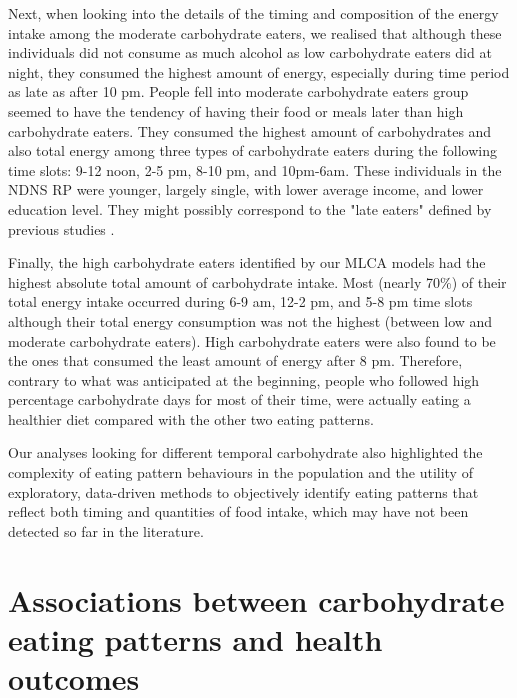 Next, when looking into the details of the timing and composition of the energy intake among the moderate carbohydrate eaters, we realised that although these individuals did not consume as much alcohol as low carbohydrate eaters did at night, they consumed the highest amount of energy, especially during time period as late as after 10 pm. People fell into moderate carbohydrate eaters group seemed to have the tendency of having their food or meals later than high carbohydrate eaters. They consumed the highest amount of carbohydrates and also total energy among three types of carbohydrate eaters during the following time slots: 9-12 noon, 2-5 pm, 8-10 pm, and 10pm-6am. These individuals in the NDNS RP were younger, largely single, with lower average income, and lower education level. They might possibly correspond to the "late eaters" defined by previous studies \parencite{leech2017temporal, mansukhani2018investigating}. 

Finally, the high carbohydrate eaters identified by our MLCA models had the highest absolute total amount of carbohydrate intake. Most (nearly 70\%) of their total energy intake occurred during 6-9 am, 12-2 pm, and 5-8 pm time slots although their total energy consumption was not the highest (between low and moderate carbohydrate eaters). High carbohydrate eaters were also found to be the ones that consumed the least amount of energy after 8 pm. Therefore, contrary to what was anticipated at the beginning, people who followed high percentage carbohydrate days for most of their time, were actually eating a healthier diet compared with the other two eating patterns. 

Our analyses looking for different temporal carbohydrate also highlighted the complexity of eating pattern behaviours in the population and the utility of exploratory, data-driven methods to objectively identify eating patterns that reflect both timing and quantities of food intake, which may have not been detected so far in the literature.


\section{Associations between carbohydrate eating patterns and health outcomes}

